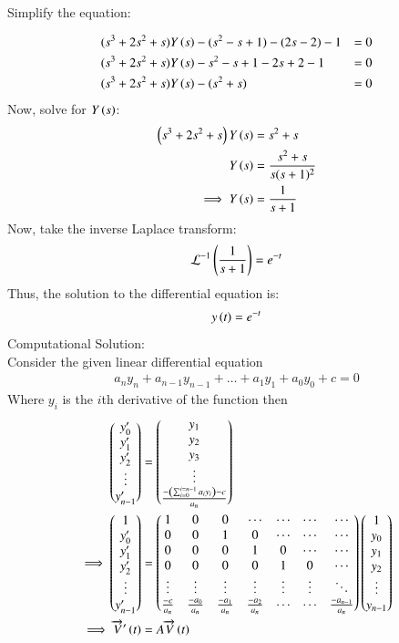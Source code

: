 \documentclass[journal]{IEEEtran}
\begin{document}
Simplify the equation:

\begin{align}
&(s^3 + 2s^2 + s) Y\left(s\right) - (s^2 - s + 1) - (2s - 2) - 1 &= 0 \\
&(s^3 + 2s^2 + s) Y\left(s\right) - s^2 - s + 1 - 2s + 2 - 1 &= 0 \\
&(s^3 + 2s^2 + s) Y\left(s\right) - (s^2 + s) &= 0
\end{align}
Now, solve for \( Y\left(s\right) \):
\begin{align}
\left(s^3 + 2s^2 + s\right) Y\left(s\right) &= s^2 + s \\
Y\left(s\right) &= \frac{s^2 + s}{s(s+1)^2}\\
\implies Y\left(s\right) &= \frac{1}{s + 1}
\end{align}
Now, take the inverse Laplace transform:
\begin{align}
\mathcal{L}^{-1}\left(\frac{1}{s + 1}\right) = e^{-t}
\end{align}
Thus, the solution to the differential equation is:
\begin{align}
   y\left(t\right) = e^{-t} 
\end{align}
\newline
Computational Solution:\\
Consider the given linear differential equation
\begin{align}
	a_{n}y_{n} + a_{n-1}y_{n-1} + \dots + a_{1}y_1 + a_{0}y_{0} + c = 0
\end{align}
Where $y_{i}$ is the $i$th derivative of the function then
\begin{align}
    \begin{pmatrix}y_{0}^{\prime}\\y_{1}^{\prime}\\y_{2}^{\prime}\\ \vdots\\y^{\prime}_{n-1}\end{pmatrix}&=\begin{pmatrix}y_{1}\\y_{2}\\y_{3}\\ \vdots\\ \frac{-\left(\sum_{i=0}^{i=n-1}a_iy_i\right)-c}{a_n}\end{pmatrix}\\
    \implies  \begin{pmatrix}1\\y_{0}^{\prime}\\y_{1}^{\prime}\\y_{2}^{\prime}\\ \vdots\\y^{\prime}_{n-1}\end{pmatrix}&=\begin{pmatrix}1&0&0&\cdots&\cdots&\cdots&\cdots\\0&0&1&0&\cdots&\cdots&\cdots\\0&0&0&1&0&\cdots&\cdots\\0&0&0&0&1&0&\cdots\\ \vdots&\vdots&\vdots&\vdots&\vdots&\vdots&\ddots\\ \frac{-c}{a_n}&\frac{-a_{0}}{a_n}&\frac{-a_{1}}{a_n}&\frac{-a_{2}}{a_n}&\cdots&\cdots&\frac{-a_{n-1}}{a_n}\end{pmatrix}\begin{pmatrix}1\\y_{0}\\y_{1}\\y_{2}\\ \vdots\\y_{n-1}\end{pmatrix}\\
    \implies \overrightarrow{V}^{\prime}\left(t\right)&=A\overrightarrow{V}\left(t\right)
\end{align}
\end{document}
